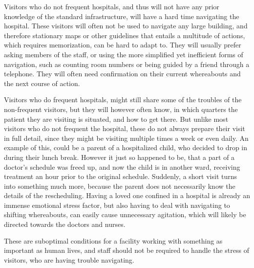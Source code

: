 Visitors who do not frequent hospitals, and thus will not have any prior knowledge of the standard infrastructure, will have a hard time navigating the hospital. These visitors will often not be used to navigate any large building, and therefore stationary maps or other guidelines that entails a multitude of actions, which requires memorization, can be hard to adapt to. They will usually prefer asking members of the staff, or using the more simplified yet inefficient forms of navigation, such as counting room numbers or being guided by a friend through a telephone. They will often need confirmation on their current whereabouts and the next course of action.

Visitors who do frequent hospitals, might still share some of the troubles of the non-frequent visitors, but they will however often know, in which quarters the patient they are visiting is situated, and how to get there. But unlike most visitors who do not frequent the hospital, these do not always prepare their visit in full detail, since they might be visiting multiple times a week or even daily. An example of this, could be a parent of a hospitalized child, who decided to drop in during their lunch break. However it just so happened to be, that a part of a doctor's schedule was freed up, and now the child is in another ward, receiving treatment an hour prior to the original schedule. Suddenly, a short visit turns into something much more, because the parent does not necessarily know the details of the rescheduling. Having a loved one confined in a hospital is already an immense emotional stress factor, but also having to deal with navigating to shifting whereabouts, can easily cause unnecessary agitation, which will likely be directed towards the doctors and nurses.

These are suboptimal conditions for a facility working with something as important as human lives, and staff should not be required to handle the stress of visitors, who are having trouble navigating.



